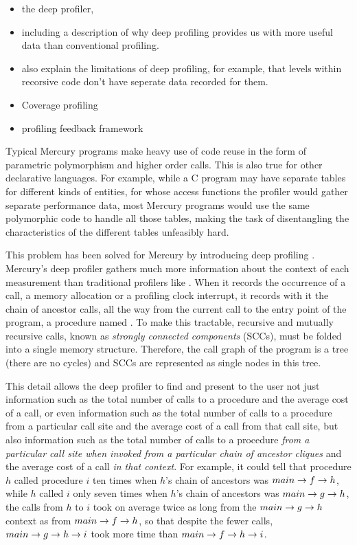 

\begin{itemize}
\item the deep profiler,
\item including a description of why deep profiling provides us with
      more useful data than conventional profiling.
\item also explain the limitations of deep profiling,
      for example, that levels within recorsive code don't have seperate
      data recorded for them.
\item Coverage profiling 
\item profiling feedback framework
\end{itemize}

Typical Mercury programs make heavy use of code reuse in the form of
parametric polymorphism and higher order calls.
This is also true for other declarative languages.
For example, while a C program may have
separate tables for different kinds of entities,
for whose access functions
the profiler would gather separate performance data,
most Mercury programs would use
the same polymorphic code to handle all those tables,
making the task of disentangling the characteristics of the different tables
unfeasibly hard.

This problem has been solved for Mercury by introducing deep profiling
\citep{conway:2001:mercury-deep}.
Mercury's deep profiler gathers much more information about the context of
each measurement than traditional profilers like \cite{gprof}.
When it records the occurrence of a call,
a memory allocation or a profiling clock interrupt,
it records with it the chain of ancestor calls,
all the way from the current call to the entry point of the program,
a procedure named .
To make this tractable,
recursive and mutually recursive calls,
known as \emph{strongly connected components} (SCCs),
must be folded into a single memory structure.
Therefore, the call graph of the program is a tree (there are no cycles)
and SCCs are represented as single nodes in this tree.

This detail allows the deep profiler to find and present to the user
not just information such as the total number of calls to a procedure
and the average cost of a call,
or even information such as the total number of calls to a procedure
from a particular call site and the average cost of a call from that call site,
but also information such as the total number of calls to a procedure
\emph{from a particular call site
when invoked from a particular chain of ancestor cliques}
and the average cost of a call \emph{in that context}.
For example, it could tell that
procedure $h$ called procedure $i$ ten times
when $h$'s chain of ancestors was $main \rightarrow f \rightarrow h$,
while $h$ called $i$ only seven times
when $h$'s chain of ancestors was $main \rightarrow g \rightarrow h$,
the calls from $h$ to $i$ took on average twice as long
from the $main \rightarrow g \rightarrow h$ context as from $main \rightarrow f \rightarrow h$,
so that despite the fewer calls,
$main \rightarrow g \rightarrow h \rightarrow i$ took more time than $main \rightarrow f \rightarrow h \rightarrow i$.

